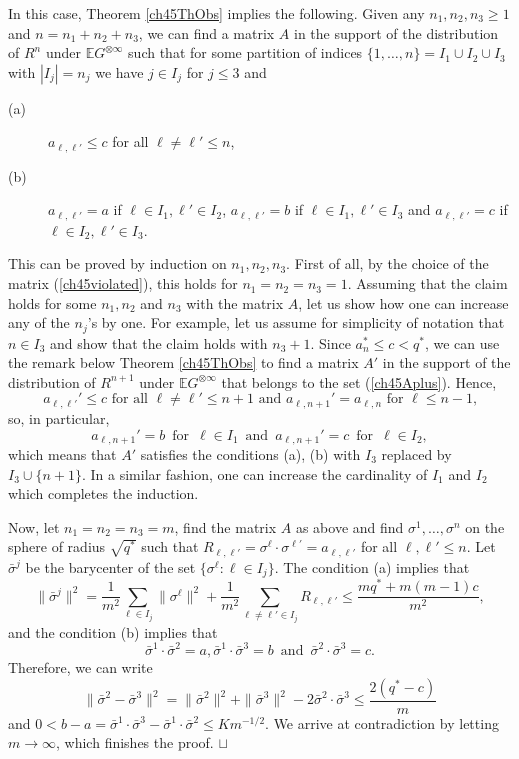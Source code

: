 \documentclass[12pt]{article}
\newcommand{\e}{\mathbb{E}}
\newcommand\qed{\hfill\hbox{\rlap{$\sqcap$}$\sqcup$}}
\theoremstyle{nonumberplain}
\begin{document}
In this case, Theorem  \ref{ch45ThObs} implies the following.  Given any $n_1, n_2, n_3\geq 1$ and $n=n_1+n_2+n_3$, we can find a matrix $A$ in the support of the distribution of  $R^n$ under $\e G^{\otimes \infty}$ such that  for some partition of indices $\{1,\ldots,n\} = I_1\cup I_2\cup I_3$ with $|I_j| = n_j$ we have $j\in I_j$ for $j\leq 3$ and 
\begin{description}
\item[(a)] 
$a_{\ell,\ell'}\leq c$ for all $\ell\not = \ell'\leq n$,

\item[(b)] 
$a_{\ell,\ell'} = a$ if $\ell\in I_1, \ell'\in I_2$, $a_{\ell,\ell'} = b$ if $\ell\in I_1, \ell'\in I_3$ and $a_{\ell,\ell'} = c$ if $\ell\in I_2, \ell'\in I_3$.
\end{description}
This can be proved by induction on $n_1,n_2,n_3.$ First of all, by the choice of the matrix (\ref{ch45violated}), this holds for $n_1=n_2=n_3=1.$ Assuming that the claim holds for some $n_1,n_2$ and $n_3$ with the matrix $A$, let us show how one can increase any of the $n_j$'s by one. For example, let us assume for simplicity of notation that $n\in I_3$ and show that the claim holds with $n_3+1.$ Since $a_n^*\leq c<q^*$, we can use the remark below Theorem \ref{ch45ThObs} to find a matrix $A'$ in the support of  the distribution of $R^{n+1}$ under $\e G^{\otimes \infty}$ that belongs to the set (\ref{ch45Aplus}). Hence, 
$$
\mbox{$a_{\ell,\ell'}' \leq c$ for all $\ell\not = \ell' \leq n+1$ and $a_{\ell,n+1}' = a_{\ell,n}$ for $\ell\leq n-1$,}
$$ 
so, in particular, 
$$
a_{\ell,n+1}' = b \,\mbox{ for }\, \ell\in I_1 \,\mbox{ and }\,  a_{\ell,n+1}' = c \,\mbox{ for }\, \ell\in I_2, 
$$
which means that $A'$ satisfies the conditions (a), (b)  with $I_3$ replaced by $I_3\cup \{n+1\}.$ In a similar fashion, one can increase the cardinality of $I_1$ and $I_2$ which completes the induction. 

Now, let $n_1=n_2=n_3=m$, find the matrix $A$ as above and find $\sigma^1,\ldots, \sigma^n$ on the sphere of radius $\sqrt{q^*}$ such that $R_{\ell,\ell'} = \sigma^{\ell}\cdot\sigma^{\ell'} =a_{\ell,\ell'}$ for all $\ell,\ell'\leq n.$ Let $\bar{\sigma}^j$ be the barycenter of  the set $\{\sigma^{\ell} : \ell\in I_j\}$. The condition (a) implies that  
$$
\|\bar{\sigma}^j\|^2 = \frac{1}{m^2}\sum_{\ell\in I_j} \|\sigma^{\ell}\|^2 + \frac{1}{m^2}\sum_{\ell\not = \ell'\in I_j} R_{\ell,\ell'}
\leq \frac{mq^* + m(m-1) c}{m^2},
$$
and the condition (b) implies that 
\begin{equation}
\bar{\sigma}^1\cdot \bar{\sigma}^2 = a, \bar{\sigma}^1\cdot \bar{\sigma}^3 = b \,\mbox{ and }\, \bar{\sigma}^2\cdot \bar{\sigma}^3 = c.
\end{equation}
Therefore, we can write
$$
\|\bar{\sigma}^2-\bar{\sigma}^3\|^2 = \|\bar{\sigma}^2\|^2 + \|\bar{\sigma}^3\|^2 
- 2\bar{\sigma}^2\cdot \bar{\sigma}^3 \leq \frac{2(q^* -c)}{m}
$$
and $0< b-a = \bar{\sigma}^1 \cdot \bar{\sigma}^3 -\bar{\sigma}^1\cdot \bar{\sigma}^2 \leq K m^{-1/2}.$ We arrive at contradiction by letting $m\to\infty$, which finishes the proof.
\qed
\end{document}
